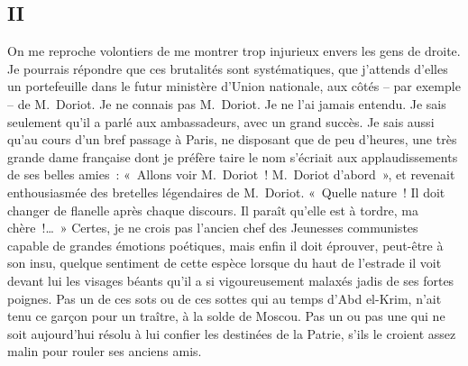 \documentclass[french,twoside]{book} %
\begin{document}
\subsection[{II}]{II}
\noindent On me reproche volontiers de me montrer trop injurieux envers les gens de droite. Je pourrais répondre que ces brutalités sont systématiques, que j’attends d’elles un portefeuille dans le futur ministère d’Union nationale, aux côtés – par exemple – de M. Doriot. Je ne connais pas M. Doriot. Je ne l’ai jamais entendu. Je sais seulement qu’il a parlé aux ambassadeurs, avec un grand succès. Je sais aussi qu’au cours d’un bref passage à Paris, ne disposant que de peu d’heures, une très grande dame française dont je préfère taire le nom s’écriait aux applaudissements de ses belles amies : « Allons voir M. Doriot ! M. Doriot d’abord », et revenait enthousiasmée des bretelles légendaires de M. Doriot. « Quelle nature ! Il doit changer de flanelle après chaque discours. Il paraît qu’elle est à tordre, ma chère !… » Certes, je ne crois pas l’ancien chef des Jeunesses communistes capable de grandes émotions poétiques, mais enfin il doit éprouver, peut-être à son insu, quelque sentiment de cette espèce lorsque du haut de l’estrade il voit devant lui les visages béants qu’il a si vigoureusement malaxés jadis de ses fortes poignes. Pas un de ces sots ou de ces sottes qui au temps d’Abd el-Krim, n’ait tenu ce garçon pour un traître, à la solde de Moscou. Pas un ou pas une qui ne soit aujourd’hui résolu à lui confier les destinées de la Patrie, s’ils le croient assez malin pour rouler ses anciens amis.\par
\bigbreak
\end{document}

